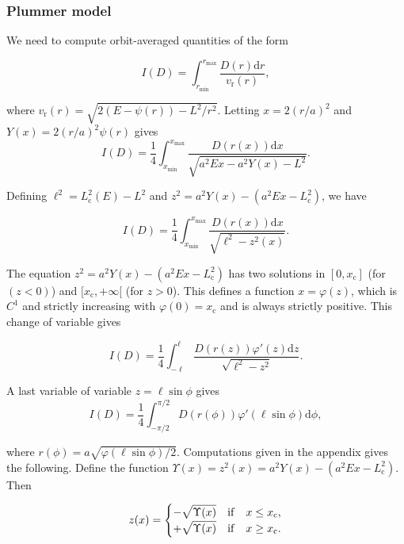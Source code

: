 \documentclass[11pt]{article}
\newcommand{\rr}{\mathrm{r}}
\newcommand{\rc}{\mathrm{c}}
\newcommand{\rd}{{\mathrm{d}}}
\newcommand{\vr}{v_{\rr}}
\newcommand{\Lc}{L_{\rc}}
\newcommand{\rmax}{r_{\max}}
\newcommand{\rmin}{r_{\min}}
\newcommand{\xc}{x_{\rc}}
\begin{document}
\subsubsection{Plummer model}
\label{subsubsec:PlummerOrbitStudy}

We need to compute orbit-averaged quantities of the form

\begin{equation}
  I(D) = \int_{\rmin}^{\rmax}  \frac{D(r)\rd r}{\vr(r)} ,
  \label{eq:I(D)} 
\end{equation}

where $\vr(r)=\sqrt{2(E-\psi(r))-L^{2}/r^{2}}$. Letting $x=2(r/a)^{2}$ and $Y(x)=2(r/a)^{2}\psi(r)$ gives
\begin{equation}
  I(D) = \frac{1}{4}\int_{x_{\min}}^{x_{\max}}  \frac{D(r(x))\rd x}{\sqrt{a^{2} E x - a^{2} Y(x) -L^{2}}} .
  \label{eq:I(D)ChgX}
\end{equation}

Defining $\ell^{2} = \Lc^{2}(E)-L^{2}$ and $z^{2}=a^{2}Y(x)-(a^{2}E x - \Lc^{2})$, we have

\begin{equation}
 I(D) = \frac{1}{4}\int_{x_{\min}}^{x_{\max}}  \frac{D(r(x))\rd x}{\sqrt{\ell^{2}-z^{2}(x)}} .
  \label{eq:I(D)ChgX_Z}
\end{equation}

The equation  $z^{2}=a^{2}Y(x)-(a^{2}E x - \Lc^{2})$ has two solutions in $[0,\xc]$ (for $(z<0)$) and $[\xc,+\infty[$ (for $z>0$). This defines a function $x=\varphi(z)$, which is $C^{1}$ and strictly increasing with $\varphi(0)=\xc$ and is always strictly positive. This change of variable gives

\begin{equation}
 I(D) = \frac{1}{4}\int_{-\ell}^{\ell}  \frac{D(r(z))\varphi'(z)\rd z}{\sqrt{\ell^{2}-z^{2}}} .
 \label{eq:I(D)Chgz}
\end{equation}

A last variable of variable $z=\ell\sin\phi$ gives
\begin{equation}
I(D) = \frac{1}{4}\int_{-\pi/2}^{\pi/2}  D(r(\phi))\varphi'(\ell\sin\phi)\rd \phi ,
\label{eq:I(D)Chgphi}
\end{equation}

where $r(\phi)=a\sqrt{\varphi(\ell\sin\phi)/2}$. Computations given in the appendix gives the following. Define the function $\Upsilon(x)=z^{2}(x)=a^{2}Y(x)-(a^{2}E x-\Lc^{2})$. Then

\begin{equation}
  z(x)=\begin{cases}
\displaystyle{ -\sqrt{\Upsilon(x)}} & {\rm{if}} \quad x\leq\xc ,\\
\displaystyle{ +\sqrt{\Upsilon(x)}} &{\rm{if}} \quad x\geq\xc .
\end{cases}
  \label{eq:z(x)}
\end{equation}
\end{document}
